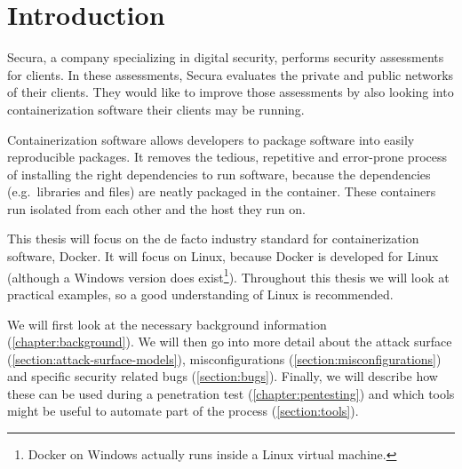 \chapter{Introduction}
Secura, a company specializing in digital security, performs security assessments for clients. In these assessments, Secura evaluates the private and public networks of their clients. They would like to improve those assessments by also looking into containerization software their clients may be running.

\hfill

Containerization software allows developers to package software into easily reproducible packages. It removes the tedious, repetitive and error-prone process of installing the right dependencies to run software, because the dependencies (e.g.\ libraries and files) are neatly packaged in the container. These containers run isolated from each other and the host they run on.

\hfill

This thesis will focus on the de facto industry standard for containerization software, Docker. It will focus on Linux, because Docker is developed for Linux (although a Windows version does exist\footnote{Docker on Windows actually runs inside a Linux virtual machine.}). Throughout this thesis we will look at practical examples, so a good understanding of Linux is recommended.

\hfill

We will first look at the necessary background information (\autoref{chapter:background}). We will then go into more detail about the attack surface (\autoref{section:attack-surface-models}), misconfigurations (\autoref{section:misconfigurations}) and specific security related bugs (\autoref{section:bugs}). Finally, we will describe how these can be used during a penetration test (\autoref{chapter:pentesting}) and which tools might be useful to automate part of the process (\autoref{section:tools}).
